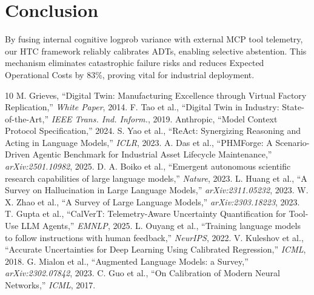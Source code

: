 \documentclass[10pt,twocolumn,a4paper]{article}
\begin{document}
\section{Conclusion}
By fusing internal cognitive logprob variance with external MCP tool telemetry, our HTC framework reliably calibrates ADTs, enabling selective abstention. This mechanism eliminates catastrophic failure risks and reduces Expected Operational Costs by 83\%, proving vital for industrial deployment.

\begin{thebibliography}{10}
 M. Grieves, ``Digital Twin: Manufacturing Excellence through Virtual Factory Replication,'' \textit{White Paper}, 2014.
 F. Tao et al., ``Digital Twin in Industry: State-of-the-Art,'' \textit{IEEE Trans. Ind. Inform.}, 2019.
 Anthropic, ``Model Context Protocol Specification,'' 2024. 
 S. Yao et al., ``ReAct: Synergizing Reasoning and Acting in Language Models,'' \textit{ICLR}, 2023.
 A. Das et al., ``PHMForge: A Scenario-Driven Agentic Benchmark for Industrial Asset Lifecycle Maintenance,'' \textit{arXiv:2501.10982}, 2025.
 D. A. Boiko et al., ``Emergent autonomous scientific research capabilities of large language models,'' \textit{Nature}, 2023.
 L. Huang et al., ``A Survey on Hallucination in Large Language Models,'' \textit{arXiv:2311.05232}, 2023.
 W. X. Zhao et al., ``A Survey of Large Language Models,'' \textit{arXiv:2303.18223}, 2023.
 T. Gupta et al., ``CalVerT: Telemetry-Aware Uncertainty Quantification for Tool-Use LLM Agents,'' \textit{EMNLP}, 2025.
 L. Ouyang et al., ``Training language models to follow instructions with human feedback,'' \textit{NeurIPS}, 2022.
 V. Kuleshov et al., ``Accurate Uncertainties for Deep Learning Using Calibrated Regression,'' \textit{ICML}, 2018.
 G. Mialon et al., ``Augmented Language Models: a Survey,'' \textit{arXiv:2302.07842}, 2023.
 C. Guo et al., ``On Calibration of Modern Neural Networks,'' \textit{ICML}, 2017.
\end{thebibliography}
\end{document}
